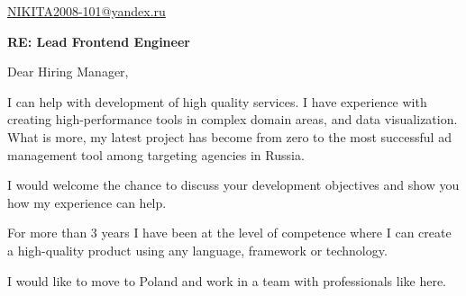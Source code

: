 \documentclass{yb}
\begin{document}
{\scshape\bfseries\Large {}}\newline
\href{mailto:NIKITA2008-101@yandex.ru}{NIKITA2008-101@yandex.ru}

\textbf{RE: Lead Frontend Engineer}



Dear Hiring Manager,

I can help with development of high quality services. I have experience with creating high-performance tools in complex domain areas, and data visualization. What is more, my latest project has become from zero to the most successful ad management tool among targeting agencies in Russia.

I would welcome the chance to discuss your development objectives and show you how my experience can help.

For more than 3 years I have been at the level of competence where I can create a high-quality product using any language, framework or technology.

I would like to move to Poland and work in a team with professionals like here.
\end{document}
